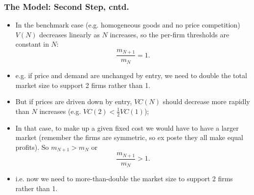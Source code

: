\documentclass[notes=show]{beamer}
\begin{document}
\begin{frame}%

\frametitle{The Model: Second Step, cntd.}

\begin{itemize}
\item In the benchmark case (e.g. homogeneous goods and no price
competition) $V(N)$ decreases linearly as $N$ increases, so the per-firm
thresholds are constant in $N$: 
\begin{equation*}
\frac{m_{N+1}}{m_{N}}=1.
\end{equation*}

\item e.g. if price and demand are unchanged by entry, we need to double the
total market size to support 2 firms rather than 1.

\item But if prices are driven down by entry, $VC(N)$ should decrease more
rapidly than $N$ increases (e.g. $VC(2)<\frac{1}{2}VC(1)$);

\item In that case, to make up a given fixed cost we would have to have a
larger market (remember the firms are symmetric, so ex poste they all make
equal profits). So $m_{N+1}>m_{N}$ or 
\begin{equation*}
\frac{m_{N+1}}{m_{N}}>1.
\end{equation*}

\item i.e. now we need to more-than-double the market size to support 2
firms rather than 1.
\end{itemize}

\end{frame}%
\end{document}

